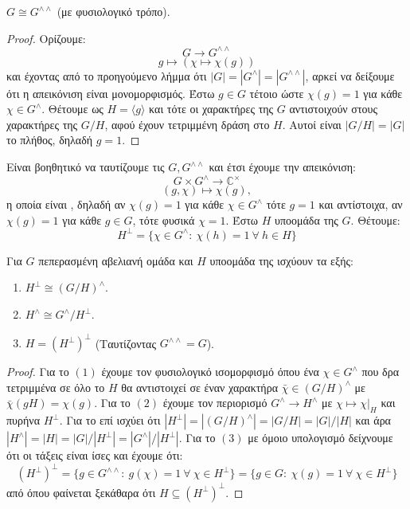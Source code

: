 \begin{theorem} $G\cong G^{\wedge \wedge}$ (με φυσιολογικό τρόπο). \label{chars_natural_theorem}
\end{theorem}


\begin{proof} Ορίζουμε:
	$$G \longrightarrow G^{\wedge\wedge}$$
	$$g \longmapsto (\chi \mapsto \chi(g))$$ και έχοντας από το προηγούμενο λήμμα ότι $|G| = |G^{\wedge}| = |G^{\wedge \wedge}|$, 
	αρκεί να δείξουμε ότι η απεικόνιση είναι μονομορφισμός. Έστω $g \in G$ τέτοιο ώστε $\chi(g) = 1$ για κάθε $\chi \in G^{\wedge}$. 
	Θέτουμε ως $H=\langle g \rangle$ και τότε οι χαρακτήρες της $G$ αντιστοιχούν στους χαρακτήρες της $G/H$, αφού έχουν τετριμμένη δράση στο $H$. Αυτοί 
	είναι $|G/H|=|G|$ το πλήθος, δηλαδή $g=1$.
\end{proof}

\noindent Είναι βοηθητικό να ταυτίζουμε τις $G,G^{\wedge\wedge}$ και έτσι έχουμε την απεικόνιση:
$$G\times G^{\wedge} \longrightarrow \mathbb{C}^\times$$
$$(g,\chi) \longmapsto \chi(g),$$ η οποία είναι , δηλαδή αν $\chi(g) = 1$ για κάθε $\chi \in G^{\wedge}$ τότε $g=1$ και αντίστοιχα, 
αν $\chi(g)=1$ για κάθε $g \in G$, τότε φυσικά $\chi = 1$. Έστω $H$ υποομάδα της $G$. Θέτουμε:
$$H^\perp = \{ \chi \in G^{\wedge}: \ \chi(h) =1 \ \forall \ h \in H\}$$



\begin{lemma} Για $G$ πεπερασμένη αβελιανή ομάδα και $H$ υποομάδα της ισχύουν τα εξής:
	\begin{enumerate}
	\item $H^{\perp} \cong (G/H)^{\wedge}$.
	\item $H^{\wedge} \cong G^{\wedge}/H^{\perp}$.
	\item $H = (H^{\perp})^{\perp}$ (Ταυτίζοντας $G^{\wedge\wedge} = G$).
\end{enumerate}
\end{lemma}

\begin{proof}
	Για το $(1)$ έχουμε τον φυσιολογικό ισομορφισμό όπου ένα $\chi \in G^{\wedge}$ που δρα τετριμμένα σε όλο το $H$ θα αντιστοιχεί σε έναν χαρακτήρα 
	$\bar{\chi} \in (G/H)^{\wedge}$ με $\bar{\chi}(gH) = \chi(g)$. Για το $(2)$ έχουμε τον περιορισμό $G^{\wedge}\rightarrow H^{\wedge}$ με 
	$\chi\mapsto \chi|_H$ και πυρήνα $H^{\perp}$. Για το επί ισχύει ότι $|H^{\perp}| = |(G/H)^{\wedge}| = |G/H| = |G|/|H|$ και άρα $|H^{\wedge}| = |H| = |G|/|H^{\perp}| = |G^{\wedge}|/|H^{\perp}|$. Για το $(3)$ με όμοιο υπολογισμό δείχνουμε ότι οι τάξεις είναι ίσες και έχουμε ότι:
	$$(H^{\perp})^{\perp} = \{g \in G^{\wedge\wedge}: \  g(\chi) = 1 \ \forall \ \chi \in H^{\perp}\} = \{g \in G: \ \chi(g)=1 \ \forall \ \chi \in H^{\perp} \}$$
	από όπου φαίνεται ξεκάθαρα ότι $H\subseteq (H^{\perp})^{\perp}$.
\end{proof}


